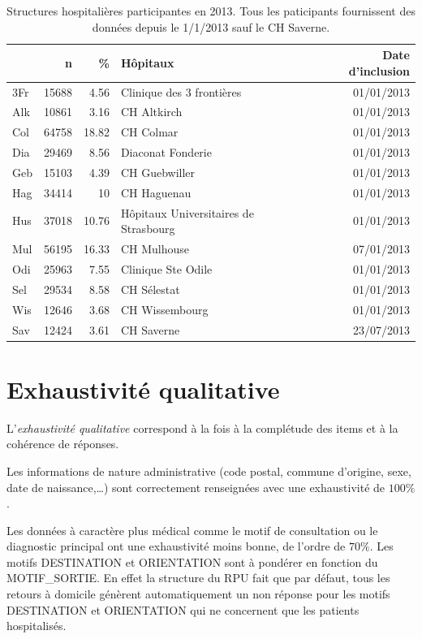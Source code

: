 \documentclass[12pt,english,french,twoside]{book}\usepackage[]{graphicx}\usepackage[]{color}
\begin{document}
\begin{table}[ht]
\centering
\begin{tabular}{|l|r|r|l|r|}
  \hline
 & n & \% & Hôpitaux & Date d'inclusion \\ 
  \hline
3Fr & 15688 & 4.56 & Clinique des 3 frontières & 01/01/2013 \\ 
  Alk & 10861 & 3.16 & CH Altkirch & 01/01/2013 \\ 
  Col & 64758 & 18.82 & CH Colmar & 01/01/2013 \\ 
  Dia & 29469 & 8.56 & Diaconat Fonderie & 01/01/2013 \\ 
  Geb & 15103 & 4.39 & CH Guebwiller & 01/01/2013 \\ 
  Hag & 34414 & 10 & CH Haguenau & 01/01/2013 \\ 
  Hus & 37018 & 10.76 & Hôpitaux Universitaires de Strasbourg & 01/01/2013 \\ 
  Mul & 56195 & 16.33 & CH Mulhouse & 07/01/2013 \\ 
  Odi & 25963 & 7.55 & Clinique Ste Odile & 01/01/2013 \\ 
  Sel & 29534 & 8.58 & CH Sélestat & 01/01/2013 \\ 
  Wis & 12646 & 3.68 & CH Wissembourg & 01/01/2013 \\ 
  Sav & 12424 & 3.61 & CH Saverne & 23/07/2013 \\ 
   \hline
\end{tabular}
\caption[Structures hospitalières participantes en 2013]{Structures hospitalières participantes en 2013. Tous les paticipants fournissent des données depuis le 1/1/2013 sauf le CH Saverne.} 
\label{tab1}
\end{table}


\section{Exhaustivité qualitative}  

L'\emph{exhaustivité qualitative} correspond à la fois à la complétude des items et à la cohérence de réponses.

Les informations de nature administrative (code postal, commune d'origine, sexe, date de naissance,\dots ) sont correctement renseignées avec une exhaustivité de $100\%$.

Les données à caractère plus médical comme le motif de consultation ou le diagnostic principal ont une exhaustivité moins bonne, de l'ordre de $70\%$. Les motifs DESTINATION et ORIENTATION sont à pondérer en fonction du MOTIF\_SORTIE. En effet la structure du RPU fait que par défaut, tous les retours à domicile génèrent automatiquement un non réponse pour les motifs DESTINATION et ORIENTATION qui ne concernent que les patients hospitalisés.
\end{document}
